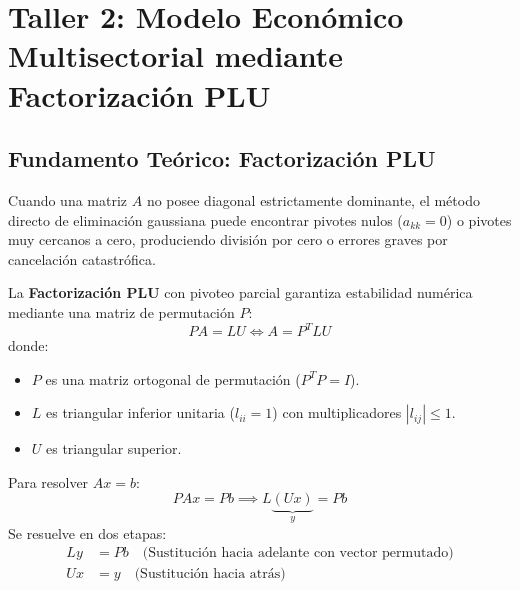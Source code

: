 \documentclass[11pt,a4paper]{article}
\theoremstyle{definition}
\theoremstyle{remark}
\begin{document}
\newpage
\section{Taller 2: Modelo Económico Multisectorial mediante Factorización PLU}

\subsection{Fundamento Teórico: Factorización PLU}
Cuando una matriz $A$ no posee diagonal estrictamente dominante, el método directo de eliminación gaussiana puede encontrar pivotes nulos ($a_{kk} = 0$) o pivotes muy cercanos a cero, produciendo división por cero o errores graves por cancelación catastrófica.

La \textbf{Factorización PLU} con pivoteo parcial garantiza estabilidad numérica mediante una matriz de permutación $P$:
\begin{equation}
    P A = L U \iff A = P^T L U
\end{equation}
donde:
\begin{itemize}[leftmargin=*]
    \item $P$ es una matriz ortogonal de permutación ($P^T P = I$).
    \item $L$ es triangular inferior unitaria ($l_{ii} = 1$) con multiplicadores $|l_{ij}| \le 1$.
    \item $U$ es triangular superior.
\end{itemize}

Para resolver $Ax = b$:
\begin{equation}
    P A x = P b \implies L \underbrace{(U x)}_{y} = P b
\end{equation}
Se resuelve en dos etapas:
\begin{align}
    L y &= P b \quad \text{(Sustitución hacia adelante con vector permutado)} \\
    U x &= y \quad \text{(Sustitución hacia atrás)}
\end{align}
\end{document}
